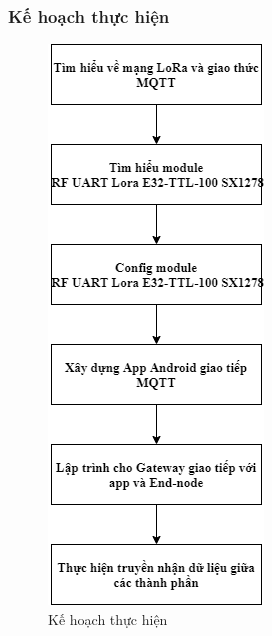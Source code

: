\subsubsection{Kế hoạch thực hiện}
\begin{figure}[H]
	\centering
	\includegraphics[scale=.5]{Chapter 1/image chapter 1/kehoachthuchien.png}
	\caption[Kế hoạch thực hiện]{Kế hoạch thực hiện}
	\label{hinh11}
\end{figure}
